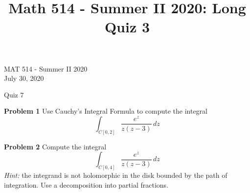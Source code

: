 \documentclass[12pt,oneside]{exam}
\title{Math 514 - Summer II 2020: Long Quiz 3}
\newenvironment{exercise}[1]{\vspace{.1in}\noindent\textbf{Problem #1 \hspace{.05em}}}{}
\begin{document}
\begin{flushright}
\sc MAT 514 - Summer II 2020\\
July 30, 2020
\end{flushright}
\bigskip
 
\begin{center}
\textsf{Quiz 7} 
\end{center}

\begin{exercise}{1}
Use Cauchy's Integral Formula to compute the integral
\begin{equation*}
\int_{C[0,2]} \frac{e^z}{z(z-3)}\, dz
\end{equation*}
\end{exercise}

\vfill

\begin{exercise}{2}
Compute the integral 
\begin{equation*}
\int_{C[0,4]} \frac{e^z}{z(z-3)}\, dz
\end{equation*}
\emph{Hint:} the integrand is not holomorphic in the disk bounded by the path of integration. Use a decomposition into partial fractions.
\end{exercise}

\vfill
\end{document}
